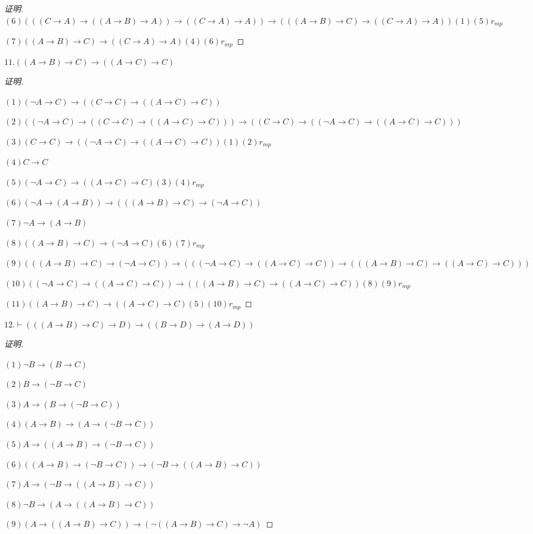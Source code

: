 \documentclass{article}
\begin{document}
\begin{CJK*}{UTF8}{gbsn}
\begin{proof}[证明]
$(6)(((C\to A)\to ((A\to B)\to A))\to ((C\to A)\to A)) \to (((A\to B)\to C)\to ((C\to A)\to A))(1)(5)r_{mp}$

$(7)((A\to B)\to C)\to ((C\to A)\to A)(4)(6)r_{mp}$
\end{proof}

$11.((A\to B)\to C)\to ((A\to C)\to C)$
\begin{proof}[证明]$\quad$

  $(1)(\lnot A\to C)\to ((C\to C)\to ((A\to C)\to C))$

  $(2)((\lnot A\to C)\to ((C\to C)\to ((A\to C)\to C)))\to ((C\to C)\to ((\lnot A\to C)\to ((A\to C)\to C)))$

  $(3)(C\to C)\to ((\lnot A\to C)\to ((A\to C)\to C))(1)(2)r_{mp}$

  $(4)C\to C$

  $(5)(\lnot A\to C)\to ((A\to C)\to C)(3)(4)r_{mp}$

  $(6)(\lnot A\to (A\to B))\to (((A\to B)\to C)\to (\lnot A\to C))$

  $(7)\lnot A\to (A\to B)$

  $(8)((A\to B)\to C)\to (\lnot A\to C)(6)(7)r_{mp}$

  $(9)(((A\to B)\to C)\to (\lnot A\to C))\to (((\lnot A\to C)\to ((A\to C)\to C))\to(((A\to B)\to C)\to ((A\to C)\to C)) )$

  $(10)((\lnot A\to C)\to ((A\to C)\to C))\to(((A\to B)\to C)\to ((A\to C)\to C))(8)(9)r_{mp}$

  $(11)((A\to B)\to C)\to ((A\to C)\to C)(5)(10)r_{mp}$

\end{proof}

$12.\vdash (((A\to B)\to C)\to D)\to((B\to D)\to (A\to D))$

\begin{proof}[证明]$\quad$

  $(1)\lnot B\to (B\to C)$

  $(2)B\to (\lnot B\to C)$

  $(3)A\to (B\to (\lnot B\to C))$

  $(4)(A\to B)\to (A\to (\lnot B\to C))$

  $(5)A\to ((A\to B)\to (\lnot B\to C))$

  $(6)((A\to B)\to (\lnot B\to C))\to (\lnot B\to ((A\to B)\to C))$

  $(7)A\to (\lnot B\to ((A\to B)\to C))$

  $(8)\lnot B\to (A\to ((A\to B)\to C))$

  $(9)(A\to ((A\to B)\to C))\to (\lnot((A\to B)\to C)\to \lnot A)$


\end{proof}
\end{CJK*}
\end{document}

